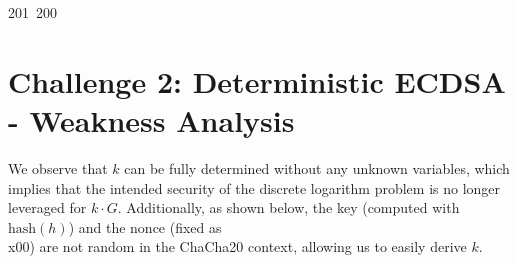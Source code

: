 201~200~\documentclass{article}
\begin{document}
	                                                                        	                                                                    	                                	                    	                    	                        	                        	                    	                                                                	                	                                                                    	                    							                                                                                                                                                            \section{Challenge 2: Deterministic ECDSA - Weakness Analysis}

	                                                                        	                                                                    	                                	                    	                    	                        	                        	                    	                                                                	                	                                                                    	                    							                                                                                                                                                            We observe that \( k \) can be fully determined without any unknown variables, which implies that the intended security of the discrete logarithm problem is no longer leveraged for \( k \cdot G \). Additionally, as shown below, the key (computed with \( \text{hash}(h) \)) and the nonce (fixed as \\x00) are not random in the ChaCha20 context, allowing us to easily derive \( k \).
\end{document}
